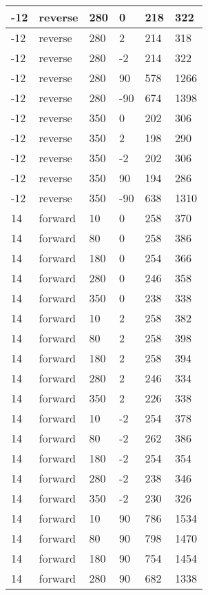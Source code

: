 \begin{longtable}{|l|l|l|l|l|l|}
			\hline
			-12 & reverse & 280 & 0 & 218 & 322 \\
			\hline
			-12 & reverse & 280 & 2 & 214 & 318 \\
			\hline
			-12 & reverse & 280 & -2 & 214 & 322 \\
			\hline
			-12 & reverse & 280 & 90 & 578 & 1266 \\
			\hline
			-12 & reverse & 280 & -90 & 674 & 1398 \\
			\hline
			-12 & reverse & 350 & 0 & 202 & 306 \\
			\hline
			-12 & reverse & 350 & 2 & 198 & 290 \\
			\hline
			-12 & reverse & 350 & -2 & 202 & 306 \\
			\hline
			-12 & reverse & 350 & 90 & 194 & 286 \\
			\hline
			-12 & reverse & 350 & -90 & 638 & 1310 \\
			\hline
			14 & forward & 10 & 0 & 258 & 370 \\
			\hline
			14 & forward & 80 & 0 & 258 & 386 \\
			\hline
			14 & forward & 180 & 0 & 254 & 366 \\
			\hline
			14 & forward & 280 & 0 & 246 & 358 \\
			\hline
			14 & forward & 350 & 0 & 238 & 338 \\
			\hline
			14 & forward & 10 & 2 & 258 & 382 \\
			\hline
			14 & forward & 80 & 2 & 258 & 398 \\
			\hline
			14 & forward & 180 & 2 & 258 & 394 \\
			\hline
			14 & forward & 280 & 2 & 246 & 334 \\
			\hline
			14 & forward & 350 & 2 & 226 & 338 \\
			\hline
			14 & forward & 10 & -2 & 254 & 378 \\
			\hline
			14 & forward & 80 & -2 & 262 & 386 \\
			\hline
			14 & forward & 180 & -2 & 254 & 354 \\
			\hline
			14 & forward & 280 & -2 & 238 & 346 \\
			\hline
			14 & forward & 350 & -2 & 230 & 326 \\
			\hline
			14 & forward & 10 & 90 & 786 & 1534 \\
			\hline
			14 & forward & 80 & 90 & 798 & 1470 \\
			\hline
			14 & forward & 180 & 90 & 754 & 1454 \\
			\hline
			14 & forward & 280 & 90 & 682 & 1338 \\

\end{longtable}
